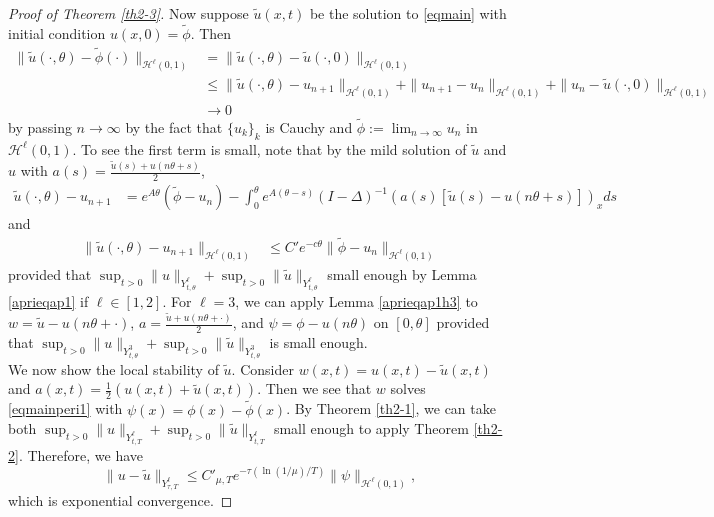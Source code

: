 \documentclass[10pt,a4paper,final]{article}
\numberwithin{equation}{section}
\newcommand{\cH}{\mathcal{H}}
\newcommand{\Gth}{\theta}
\begin{document}
\begin{proof}[Proof of Theorem \ref{th2-3}]
    Now suppose $\widetilde{u}(x,t)$ be the solution to \eqref{eqmain} with initial condition $u(x,0)=\widetilde{\phi}$. Then
    \begin{align*}
    \|\widetilde{u}(\cdot,\theta)-\widetilde{\phi}(\cdot)\|_{\cH^{\ell}(0,1)} &=\|\widetilde{u}(\cdot,\theta)-\widetilde{u}(\cdot,0)\|_{\cH^{\ell}(0,1)}\\
        &\leq \|\widetilde{u}(\cdot,\theta)-u_{n+1}\|_{\cH^{\ell}(0,1)}+\|u_{n+1}-u_n\|_{\cH^{\ell}(0,1)}+\|u_n-\widetilde{u}(\cdot,0)\|_{\cH^{\ell}(0,1)}\\
        &\to 0
    \end{align*}
    by passing $n\to \infty$ by the fact that $\{u_k\}_k$ is Cauchy and $\widetilde{\phi}:=\lim_{n\to\infty}u_n$ in $\cH^{\ell}(0,1)$. To see the first term is small, note that by the mild solution of $\widetilde{u}$ and $u$ with $a(s)=\frac{\widetilde{u}(s)+u(n\theta+s)}{2}$, 
    \begin{align*}
        \widetilde{u}(\cdot,\theta)-u_{n+1}&= e^{A\theta}(\widetilde{\phi}-u_n)-\int_{0}^{\theta}e^{A(\theta-s)}(I-\Delta)^{-1}(a(s)[\widetilde{u}(s)-u(n\theta+s)])_xds
    \end{align*}
    and 
    \begin{align*}
        \|\widetilde{u}(\cdot,\theta)-u_{n+1}\|_{\cH^{\ell}(0,1)}&\leq  C'e^{-c\theta}\|\widetilde{\phi}-u_n\|_{\cH^{\ell}(0,1)}
    \end{align*}
    provided that $\sup_{t>0}\|u\|_{Y^{\ell}_{t,\Gth}}+\sup_{t>0}\|\widetilde{u}\|_{Y^{\ell}_{t,\Gth}}$ small enough by Lemma \ref{aprieqap1} if $\ell\in [1,2]$. For $\ell=3$, we can apply Lemma \ref{aprieqap1h3} to $w=\widetilde{u}-u(n\Gth+\cdot)$, $a=\frac{\widetilde{u}+u(n\Gth+\cdot)}{2}$, and $\psi=\phi-u(n\Gth)$ on $[0,\Gth]$ provided that $\sup_{t>0}\|u\|_{Y^{3}_{t,\Gth}}+\sup_{t>0}\|\widetilde{u}\|_{Y^{3}_{t,\Gth}}$ is small enough.\\

    We now show the local stability of $\widetilde{u}$. Consider $w(x,t)=u(x,t)-\widetilde{u}(x,t)$ and $a(x,t)=\frac{1}{2}(u(x,t)+\widetilde{u}(x,t))$. Then we see that $w$ solves \eqref{eqmainperi1} with $\psi(x)=\phi(x)-\widetilde{\phi}(x)$. By Theorem \ref{th2-1}, we can take both $\sup_{t>0}\|u\|_{Y^{\ell}_{t,T}}+\sup_{t>0}\|\widetilde{u}\|_{Y^{\ell}_{t,T}}$ small enough to apply Theorem \ref{th2-2}. Therefore, we have 
    $$\|u-\widetilde{u}\|_{Y^{\ell}_{\tau,T}}\leq C'_{\mu,T}e^{-\tau(\ln(1/\mu)/T)}\|\psi\|_{\cH^{\ell}(0,1)},$$
    which is exponential convergence.  
\end{proof}
\end{document}
